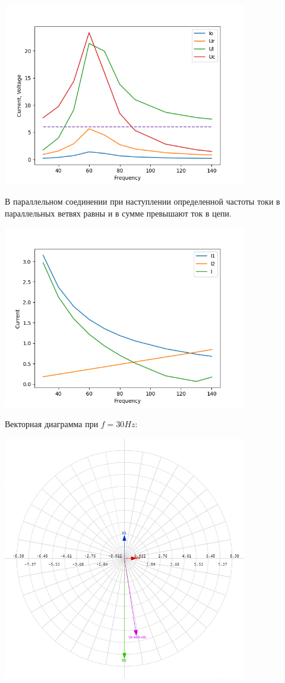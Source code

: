 \documentclass[14pt, a4paper]{article}
\begin{document}
        {\includegraphics[width=0.8\textwidth]{graph1.png}}

        В параллельном соединении при наступлении определенной частоты токи в параллельных ветвях равны и в сумме превышают ток в цепи. 

        {\includegraphics[width=0.8\textwidth]{graph2.png}}

        Векторная диаграмма при $f = 30 Hz$:

        {\includegraphics[width=0.8\textwidth]{vec30.png}}
\end{document}
